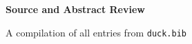 \documentclass[11pt, letterpaper]{article}
\begin{document}
\begin{center}
    \huge\textbf{Source and Abstract Review}
    \vspace{0.5em}
    
    \large A compilation of all entries from \texttt{duck.bib}
\end{center}

\nocite{*}

\printbibliography[title={All Sources and Abstracts}]
\end{document}
